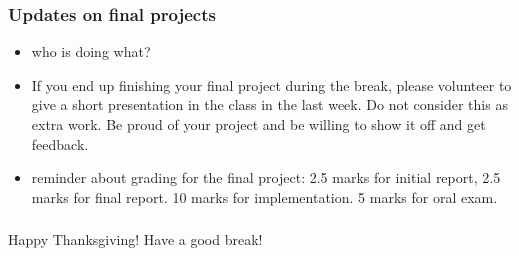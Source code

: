 \documentclass{beamer}
\begin{document}
\begin{frame}
\frametitle{Updates on final projects}
\begin{itemize}
\item who is doing what?
\item If you end up finishing your final project during the break, please volunteer to give a short presentation in the class in the last week. Do not consider this as extra work. Be proud of your project and be willing to show it off and get feedback.
\item reminder about grading for the final project: 2.5 marks for initial report, 2.5 marks for final report. 10 marks for implementation. 5 marks for oral exam. 
\end{itemize}
\end{frame}

\begin{frame}
\frametitle{}
\Large Happy Thanksgiving! Have a good break!
\end{frame}
\end{document}

